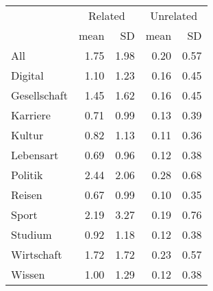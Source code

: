 \begin{table}[!htb]
    \centering
\begin{tabular}{|l|rr|rr|}
\hline
 & \multicolumn{2}{|c|}{Related} & \multicolumn{2}{|c|}{Unrelated} \\
              &   mean &  SD &   mean &   SD \\
\hline
 All         &   1.75 &             1.98 &   0.20 &             0.57 \\
 \hline
 Digital      &   1.10 &             1.23 &   0.16 &             0.45 \\
 Gesellschaft &   1.45 &             1.62 &   0.16 &             0.45 \\
 Karriere     &   0.71 &             0.99 &   0.13 &             0.39 \\
 Kultur       &   0.82 &             1.13 &   0.11 &             0.36 \\
 Lebensart    &   0.69 &             0.96 &   0.12 &             0.38 \\
 Politik      &   2.44 &             2.06 &   0.28 &             0.68 \\
 Reisen       &   0.67 &             0.99 &   0.10 &             0.35 \\
 Sport        &   2.19 &             3.27 &   0.19 &             0.76 \\
 Studium      &   0.92 &             1.18 &   0.12 &             0.38 \\
 Wirtschaft   &   1.72 &             1.72 &   0.23 &             0.57 \\
 Wissen       &   1.00 &             1.29 &   0.12 &             0.38 \\
 
\hline
\end{tabular}
    \caption{}
    \label{tab:keywords_dist}
\end{table}


